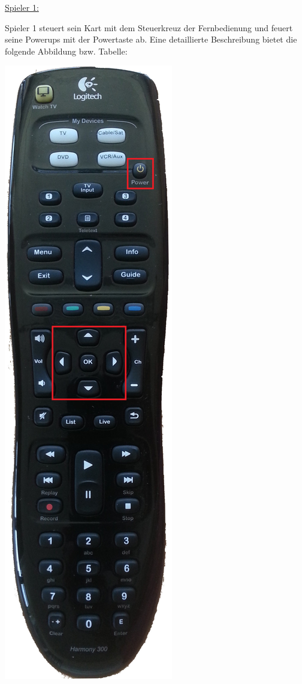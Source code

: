 \underline{Spieler 1:}

Spieler 1 steuert sein Kart mit dem Steuerkreuz der Fernbedienung und feuert seine Powerups mit der Powertaste ab. Eine detaillierte Beschreibung bietet die folgende Abbildung bzw. Tabelle:

\begin{center}
\includegraphics[scale=0.1]{Bilder/Steuerung_Spieler1}
\end{center}


